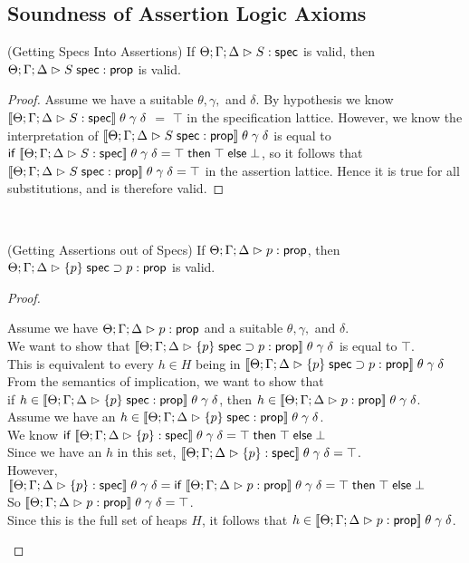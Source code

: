 \subsection{Soundness of Assertion Logic Axioms}

\begin{lemma}{(Getting Specs Into Assertions)} 
  If ${\Theta; \Gamma; \Delta} \vartriangleright {S} : \mathsf{spec}$ is valid, then ${\Theta; \Gamma; \Delta} \vartriangleright {{S}\;\mathsf{spec}} : {\mathsf{prop}}$ is valid. 
\end{lemma}
\begin{proof}
  Assume we have a suitable $\theta, \gamma,$ and $\delta$. By hypothesis we know
$[\![{{\Theta; \Gamma; \Delta} \vartriangleright {S} : \mathsf{spec}}]\!]\;\theta\;\gamma\;\delta$ $=$ $\top$ in the specification lattice. However,
we know the interpretation of $[\![{{\Theta; \Gamma; \Delta} \vartriangleright {{S}\;\mathsf{spec}} : {\mathsf{prop}}}]\!]\;\theta\;\gamma\;\delta$ is 
equal to $\mathsf{if}\;{[\![{{\Theta; \Gamma; \Delta} \vartriangleright {S} : \mathsf{spec}}]\!]\;\theta\;\gamma\;\delta = \top}\;\mathsf{then}\;{\top}\;\mathsf{else}\;{\bot}$, so it 
follows that $[\![{{\Theta; \Gamma; \Delta} \vartriangleright {{S}\;\mathsf{spec}} : {\mathsf{prop}}}]\!]\;\theta\;\gamma\;\delta = \top$ in the assertion
lattice. Hence it is true for all substitutions, and is therefore valid. 
\end{proof}\\

\begin{lemma}{(Getting Assertions out of Specs)}
If ${\Theta; \Gamma; \Delta} \vartriangleright {p} : {\mathsf{prop}}$, then ${\Theta; \Gamma; \Delta} \vartriangleright {{\{{p}\}}\;\mathsf{spec} \supset p} : {\mathsf{prop}}$ is valid. 
\end{lemma}
\begin{proof}
\begin{tabbedproof}
\oo Assume we have ${\Theta; \Gamma; \Delta} \vartriangleright {p} : {\mathsf{prop}}$ and a suitable $\theta, \gamma,$ and $\delta$. \\ 
\oo We want to show that $[\![{{\Theta; \Gamma; \Delta} \vartriangleright {{\{{p}\}}\;\mathsf{spec} \supset p} : {\mathsf{prop}}}]\!]\;\theta\;\gamma\;\delta$ is equal to $\top$.  \\
\oo This is equivalent to every $h \in H$ being in 
    $[\![{{\Theta; \Gamma; \Delta} \vartriangleright {{\{{p}\}}\;\mathsf{spec} \supset p} : {\mathsf{prop}}}]\!]\;\theta\;\gamma\;\delta$ \\
\oo From the semantics of implication, we want to show that \\ 
\ooo if $h \in [\![{{\Theta; \Gamma; \Delta} \vartriangleright {{\{{p}\}}\;\mathsf{spec}} : {\mathsf{prop}}}]\!]\;\theta\;\gamma\;\delta$, 
     then  $h \in [\![{{\Theta; \Gamma; \Delta} \vartriangleright {p} : {\mathsf{prop}}}]\!]\;\theta\;\gamma\;\delta$. \\
\oo Assume we have an $h \in [\![{{\Theta; \Gamma; \Delta} \vartriangleright {{\{{p}\}}\;\mathsf{spec}} : {\mathsf{prop}}}]\!]\;\theta\;\gamma\;\delta$. \\
\ooo We know  $\mathsf{if}\;{[\![{{\Theta; \Gamma; \Delta} \vartriangleright {\{{p}\}} : \mathsf{spec}}]\!]\;\theta\;\gamma\;\delta = \top}\;\mathsf{then}\;{\top}\;\mathsf{else}\;{\bot}$ \\
\ooo Since we have an $h$ in this set,  $[\![{{\Theta; \Gamma; \Delta} \vartriangleright {\{{p}\}} : \mathsf{spec}}]\!]\;\theta\;\gamma\;\delta = \top$. \\
\ooo However,  $[\![{{\Theta; \Gamma; \Delta} \vartriangleright {\{{p}\}} : \mathsf{spec}}]\!]\;\theta\;\gamma\;\delta = \mathsf{if}\;{[\![{{\Theta; \Gamma; \Delta} \vartriangleright {p} : {\mathsf{prop}}}]\!]\;\theta\;\gamma\;\delta = \top}\;\mathsf{then}\;{\top}\;\mathsf{else}\;{\bot}$ \\
\ooo So $[\![{{\Theta; \Gamma; \Delta} \vartriangleright {p} : {\mathsf{prop}}}]\!]\;\theta\;\gamma\;\delta = \top$. \\ 
\ooo Since this is the full set of heaps $H$, it follows that $h \in [\![{{\Theta; \Gamma; \Delta} \vartriangleright {p} : {\mathsf{prop}}}]\!]\;\theta\;\gamma\;\delta$. 
\end{tabbedproof}
\end{proof}


